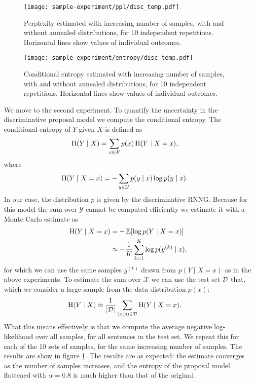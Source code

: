     \newgeometry{}  %
    \begin{figure}[ht]
      \center
    	\texttt{[image: sample-experiment/ppl/disc\_temp.pdf]}
      \caption{Perplexity estimated with increasing number of samples, with and without annealed distributions, for 10 independent repetitions. Horizontal lines show values of individual outcomes.}
      \label{fig:samples-perplexities}

    	\texttt{[image: sample-experiment/entropy/disc\_temp.pdf]}
      \caption{Conditional entropy estimated with increasing number of samples, with and without annealed distributions, for 10 independent repetitions. Horizontal lines show values of individual outcomes.}
      \label{fig:samples-entropy}
    \end{figure}
    \restoregeometry

    We move to the second experiment. To quantify the uncertainty in the discriminative proposal model we compute the conditional entropy. The conditional entropy of $Y$ given $X$ is defined as
    \begin{align*}
      \operatorname{H}(Y \mid X) &= \sum_{x \in \mathcal{X}} p(x) \operatorname{H}(Y \mid X = x),
    \end{align*}
    where
    \begin{align*}
      \operatorname{H}(Y \mid X = x)
        &= - \sum_{y \in \mathcal{Y}} p(y \mid x) \log p(y \mid x).
    \end{align*}
    In our case, the distribution $p$ is given by the discriminative RNNG. Because for this model the sum over $\mathcal{Y}$ cannot be computed efficiently we estimate it with a Monte Carlo estimate as
    \begin{align*}
      \operatorname{H}(Y \mid X = x)
        &= - \operatorname{\mathbb{E}} [ \log p(Y \mid X = x)]  \\
        &\approx - \frac{1}{K} \sum_{k=1}^K \log p(y^{(k)} \mid x),
    \end{align*}
    for which we can use the same samples $y^{(k)}$ drawn from $p(Y \mid X = x)$ as in the above experiments. To estimate the sum over $\mathcal{X}$ we can use the test set $\mathcal{D}$ that, which we consider a large sample from the data distribution $p(x)$:
    \begin{align*}
      \operatorname{H}(Y \mid X)
        &\approx \frac{1}{\lvert \mathcal{D} \rvert} \sum_{ (x, y) \in \mathcal{D} } \operatorname{H}(Y \mid X = x).
    \end{align*}
    What this means effectively is that we compute the average negative log-likelihood over all samples, for all sentences in the test set. We repeat this for each of the 10 sets of samples, for the same increasing number of samples. The results are show in figure \ref{fig:samples-entropy}. The results are as expected: the estimate converges as the number of samples increases, and the entropy of the proposal model flattened with $\alpha = 0.8$ is much higher than that of the original.


